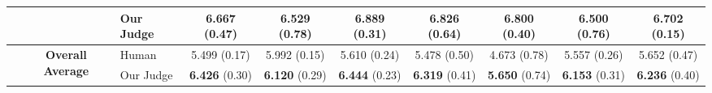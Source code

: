\documentclass{article}
\begin{document}
\begin{center}
{\begin{tabular}{@{}c c l c c c c c c c@{}}
 & & Our Judge & 6.667 {\fontsize{7.2pt}{8.6pt}\selectfont\textcolor{stdgray}{(0.47)}} & \cellcolor{greenlight}\textbf{6.529} {\fontsize{7.2pt}{8.6pt}\selectfont\textcolor{stdgray}{(0.78)}} & 6.889 {\fontsize{7.2pt}{8.6pt}\selectfont\textcolor{stdgray}{(0.31)}} & 6.826 {\fontsize{7.2pt}{8.6pt}\selectfont\textcolor{stdgray}{(0.64)}} & 6.800 {\fontsize{7.2pt}{8.6pt}\selectfont\textcolor{stdgray}{(0.40)}} & \cellcolor{greenlight}\textbf{6.500} {\fontsize{7.2pt}{8.6pt}\selectfont\textcolor{stdgray}{(0.76)}} & 6.702 {\fontsize{7.2pt}{8.6pt}\selectfont\textcolor{stdgray}{(0.15)}} \\
\midrule
 & \multirow{2}{*}{\textbf{Overall Average}} & Human & 5.499 {\fontsize{7.2pt}{8.6pt}\selectfont\textcolor{stdgray}{(0.17)}} & 5.992 {\fontsize{7.2pt}{8.6pt}\selectfont\textcolor{stdgray}{(0.15)}} & 5.610 {\fontsize{7.2pt}{8.6pt}\selectfont\textcolor{stdgray}{(0.24)}} & 5.478 {\fontsize{7.2pt}{8.6pt}\selectfont\textcolor{stdgray}{(0.50)}} & 4.673 {\fontsize{7.2pt}{8.6pt}\selectfont\textcolor{stdgray}{(0.78)}} & 5.557 {\fontsize{7.2pt}{8.6pt}\selectfont\textcolor{stdgray}{(0.26)}} & 5.652 {\fontsize{7.2pt}{8.6pt}\selectfont\textcolor{stdgray}{(0.47)}} \\
 & & Our Judge & \cellcolor{greenlight}\textbf{6.426} {\fontsize{7.2pt}{8.6pt}\selectfont\textcolor{stdgray}{(0.30)}} & \cellcolor{greendark}\textbf{6.120} {\fontsize{7.2pt}{8.6pt}\selectfont\textcolor{stdgray}{(0.29)}} & \cellcolor{greenlight}\textbf{6.444} {\fontsize{7.2pt}{8.6pt}\selectfont\textcolor{stdgray}{(0.23)}} & \cellcolor{greenlight}\textbf{6.319} {\fontsize{7.2pt}{8.6pt}\selectfont\textcolor{stdgray}{(0.41)}} & \cellcolor{greenlight}\textbf{5.650} {\fontsize{7.2pt}{8.6pt}\selectfont\textcolor{stdgray}{(0.74)}} & \cellcolor{greenlight}\textbf{6.153} {\fontsize{7.2pt}{8.6pt}\selectfont\textcolor{stdgray}{(0.31)}} & \cellcolor{greenlight}\textbf{6.236} {\fontsize{7.2pt}{8.6pt}\selectfont\textcolor{stdgray}{(0.40)}} \\
\bottomrule
\end{tabular}}
\end{center}
\end{document}
